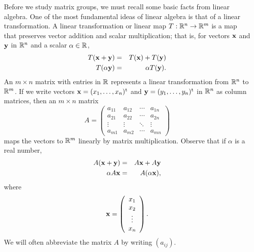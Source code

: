 Before we study matrix groups, we must recall some basic facts from
linear algebra.  One of the most fundamental ideas of linear algebra
is that of a linear transformation. A {\bfi linear
transformation\/} or {\bfi 
linear map} $T : {\Bbb R}^n \rightarrow {\Bbb R}^m$
is a map that preserves vector addition and scalar multiplication;
that is, for vectors ${\bold x}$ and ${\bold y}$ in ${\Bbb R}^n$ and a
scalar $\alpha \in {\Bbb R}$, 
\begin{eqnarray*}
T({\bold x}+{\bold y}) & = & T({\bold x}) + T({\bold y}) \\
T(\alpha {\bold y}) & = & \alpha T({\bold y}).
\end{eqnarray*}
An $m \times n$ matrix with entries in ${\Bbb R}$ represents a linear
transformation from ${\Bbb R}^n$ to ${\Bbb R}^m$. If we write vectors
${\bold x} = (x_1, \ldots, x_n)^{\rm t}$ and ${\bold y} = (y_1,
\ldots, y_n)^{\rm t}$ in ${\Bbb R}^n$ as column matrices, then an $m
\times n$ matrix 
\[
A
=
\left(
\begin{array}{cccc}
a_{11} & a_{12} & \cdots & a_{1n} \\
a_{21} & a_{22} & \cdots & a_{2n} \\
\vdots & \vdots & \ddots & \vdots \\
a_{m1} & a_{m2} & \cdots & a_{mn}
\end{array}
\right)
\]
maps the vectors to ${\Bbb R}^m$ linearly by matrix
multiplication.  Observe that if $\alpha$ is a real number,
\begin{eqnarray*}
A({\bold x} + {\bold y} ) 
& = & 
A {\bold x }+ A {\bold y} \\
\alpha A {\bold x} 
& = & 
A ( \alpha {\bold x}),
\end{eqnarray*}
where
\[
{\bold x}
=
\left(
\begin{array}{c}
x_1 \\
x_2 \\
\vdots \\
x_n
\end{array}
\right).
\]
We will often abbreviate the matrix $A$ by writing
$(a_{ij})$\label{matrixnote}.  
 
